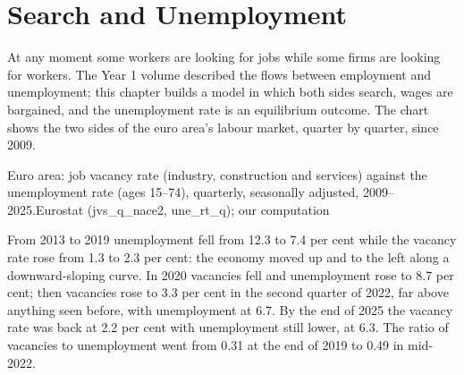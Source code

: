 \chapter{Search and Unemployment}\label{ch:b2:search-and-unemployment}

At any moment some workers are looking for jobs while some firms are looking for workers. The Year 1 volume described the
flows between employment and unemployment; this chapter builds a model in which both sides search, wages are bargained,
and the unemployment rate is an equilibrium outcome. The chart shows the two sides of the euro area's labour market,
quarter by quarter, since 2009.

\begin{openingchart}{Euro area: job vacancy rate (industry, construction and services) against the unemployment rate (ages
  15--74), quarterly, seasonally adjusted, 2009--2025.}{Eurostat (jvs\_q\_nace2, une\_rt\_q); our computation}
\end{openingchart}

From 2013 to 2019 unemployment fell from 12.3 to 7.4 per cent while the vacancy rate rose from 1.3 to 2.3 per cent: the economy
moved up and to the left along a downward-sloping curve. In 2020 vacancies fell and unemployment rose to 8.7 per cent; then
vacancies rose to 3.3 per cent in the second quarter of 2022, far above anything seen before, with unemployment at 6.7. By the end of
2025 the vacancy rate was back at 2.2 per cent with unemployment still lower, at 6.3. The ratio of vacancies to unemployment went
from 0.31 at the end of 2019 to 0.49 in mid-2022.

